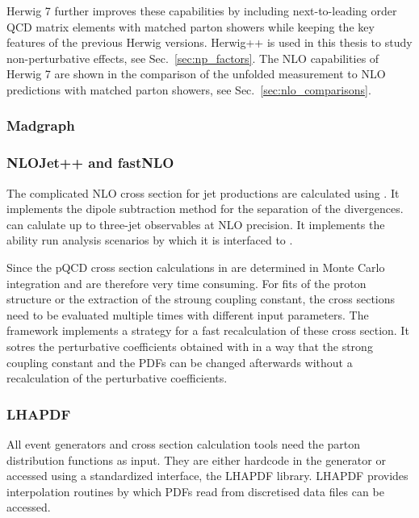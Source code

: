 Herwig 7 further improves these capabilities by including next-to-leading order
QCD matrix elements with matched parton showers while keeping the key features
of the previous Herwig versions. Herwig++ is used in this thesis to study
non-perturbative effects, see Sec.~\ref{sec:np_factors}. The NLO capabilities of
Herwig 7 are shown in the comparison of the unfolded measurement to NLO
predictions with matched parton showers, see Sec.~\ref{sec:nlo_comparisons}.

\subsubsection{Madgraph}

\subsubsection{NLOJet++ and fastNLO}
\label{sec:nlojetpp}



The complicated NLO cross section for jet productions are calculated using
\NLOJETPP. It implements the dipole subtraction method for the separation of the
divergences. \NLOJETPP can calulate up to three-jet observables at NLO precision.
It implements the ability run analysis scenarios by which it is interfaced to
\fastNLO.

Since the pQCD cross section calculations in \NLOJETPP are determined in Monte
Carlo integration and are therefore very time consuming. For fits of the proton
structure or the extraction of the stroung coupling constant, the cross sections
need to be evaluated multiple times with different input parameters. The
\fastNLO framework implements a strategy for a fast recalculation of these cross
section. It sotres the perturbative coefficients obtained with \NLOJETPP in a
way that the strong coupling constant and the PDFs can be changed afterwards
without a recalculation of the perturbative coefficients.

\subsubsection{LHAPDF}

All event generators and cross section calculation tools need the parton
distribution functions as input. They are either hardcode in the generator or
accessed using a standardized interface, the LHAPDF library. LHAPDF provides
interpolation routines by which PDFs read from discretised data files can be
accessed. 
